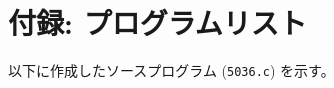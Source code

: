 \documentclass[a4paper,dvipdfmx]{jsarticle}
\begin{document}
\newpage
\appendix
\section*{付録: プログラムリスト}
以下に作成したソースプログラム (\texttt{5036.c}) を示す。


\end{document}
